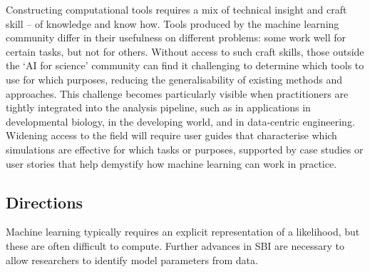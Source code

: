 Constructing computational tools requires a mix of technical insight and
craft skill -- of knowledge and know how. Tools produced by the machine
learning community differ in their usefulness on different problems:
some work well for certain tasks, but not for others. Without access to
such craft skills, those outside the `AI for science' community can find
it challenging to determine which tools to use for which purposes,
reducing the generalisability of existing methods and approaches. This
challenge becomes particularly visible when practitioners are tightly
integrated into the analysis pipeline, such as in applications in
developmental biology, in the developing world, and in data-centric
engineering. Widening access to the field will require user guides that
characterise which simulations are effective for which tasks or
purposes, supported by case studies or user stories that help demystify
how machine learning can work in practice.

\subsection{Directions}\label{directions}

Machine learning typically requires an explicit representation of a
likelihood, but these are often difficult to compute. Further advances
in SBI are necessary to allow researchers to identify model parameters
from data.


